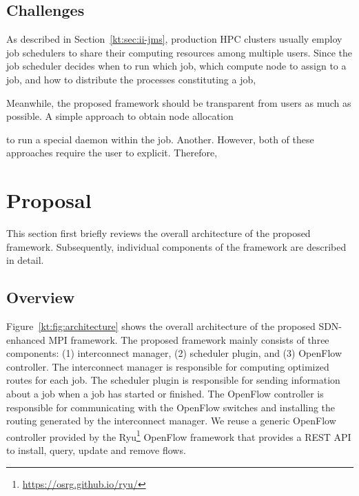 \documentclass[graybox]{svmult}
\begin{document}
\subsection{Challenges}

As described in Section~\ref{kt:sec:ii-jms}, production HPC clusters usually
employ job schedulers to share their computing resources among multiple
users. Since the job scheduler decides when to run which job, which compute
node to assign to a job, and how to distribute the processes constituting a
job,


Meanwhile, the proposed framework should be transparent from users as much as
possible. A simple approach to obtain node allocation

to run a special daemon within the job. Another. However, both of these
approaches require the user to explicit. Therefore,


\section{Proposal}\label{kt:sec:iii}

This section first briefly reviews the overall architecture of the proposed
framework. Subsequently, individual components of the framework are described
in detail.

\subsection{Overview}



Figure~\ref{kt:fig:architecture} shows the overall architecture of the
proposed SDN-enhanced MPI framework. The proposed framework mainly consists of
three components: (1) interconnect manager, (2) scheduler plugin, and (3)
OpenFlow controller. The interconnect manager is responsible for computing
optimized routes  for each job. The scheduler plugin is responsible
for sending information about a job when a job has started or finished. The
OpenFlow controller is responsible for communicating with the OpenFlow
switches and installing the routing generated by the interconnect manager.
We reuse a generic OpenFlow controller provided by the
Ryu\footnote{\url{https://osrg.github.io/ryu/}} OpenFlow framework that
provides a REST API to install, query, update and remove flows.
\end{document}
